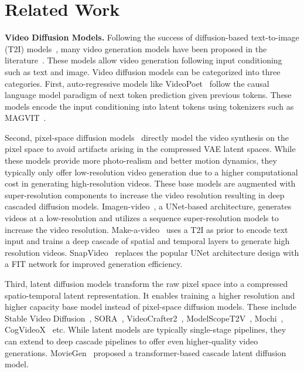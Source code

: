 \section{Related Work}
\textbf{Video Diffusion Models.} Following the success of diffusion-based text-to-image (T2I) models~\cite{sd2.1,podell2023sdxl,deepfloyd,liu2024playgroundv3,flux,liu2023hyperhuman,kolors,li2024snapfusion,gao2024lumina,kag2024ascan}, many video generation models have been proposed in the literature~\cite{blattmann2023stablevideodiffusionscaling, singer2023makeavideo,Menapace_2024_CVPR,ho2022imagenvideohighdefinition}. These models allow video generation following input conditioning such as text and image. Video diffusion models can be categorized into three categories. First, auto-regressive models like VideoPoet~\cite{kondratyuk2024videopoetlargelanguagemodel} follow the causal language model paradigm of next token prediction given previous tokens. These models encode the input conditioning into latent tokens using tokenizers such as MAGVIT~\cite{yu2023magvit}.

Second, pixel-space diffusion models~\cite{Menapace_2024_CVPR,ho2022imagenvideohighdefinition,singer2023makeavideo} directly model the video synthesis on the pixel space to avoid artifacts arising in the compressed VAE latent spaces. While these models provide more photo-realism and better motion dynamics, they typically only offer low-resolution video generation due to a higher computational cost in generating high-resolution videos. These base models are augmented with super-resolution components to increase the video resolution resulting in deep cascaded diffusion models. Imagen-video~\cite{ho2022imagenvideohighdefinition}, a UNet-based architecture,  generates videos at a low-resolution and utilizes a sequence super-resolution models to increase the video resolution. Make-a-video~\cite{singer2023makeavideo} uses a T2I as prior to encode text input and trains a deep cascade of spatial and temporal layers to generate high resolution videos. SnapVideo~\cite{Menapace_2024_CVPR} replaces the popular UNet architecture design with a FIT network for improved generation efficiency.

Third, latent diffusion models transform the raw pixel space into a compressed 
spatio-temporal latent representation. It enables training a higher resolution and higher capacity base model instead of pixel-space diffusion models. These include Stable Video Diffusion~\cite{blattmann2023stablevideodiffusionscaling}, SORA~\cite{videoworldsimulators2024}, VideoCrafter2~\cite{chen2024videocrafter2}, ModelScopeT2V~\cite{wang2023modelscope}, Mochi~\cite{genmo2024mochi}, CogVideoX~\cite{yang2024cogvideox, hong2022cogvideo} etc. While latent models are typically single-stage pipelines, they can extend to deep cascade pipelines to offer even higher-quality video generations. MovieGen~\cite{polyak2024moviegencastmedia} proposed a transformer-based cascade latent diffusion model.

